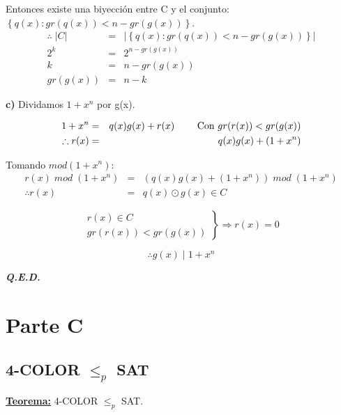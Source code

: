 \documentclass[12pt,a4paper]{report}
\newcommand{\QED}{\hfill \textit{\textbf{Q.E.D.}}}
\begin{document}
			\par Entonces existe una biyección entre C y el conjunto: $\left\lbrace q(x) :  gr(q(x)) < n - gr(g(x)) \right\rbrace$.
			\begin{eqnarray}
				\nonumber \therefore \; \lvert C \rvert &=& \lvert \left\lbrace q(x) : gr(q(x)) < n - gr(g(x)) \right\rbrace \rvert \\
				\nonumber 2^{k} &=& 2^{n - gr(g(x))} \\
				\nonumber k &=& n - gr(g(x)) \\
				\nonumber gr(g(x)) &=& n - k
			\end{eqnarray}

			\textbf{c)} Dividamos $1 + x^{n}$ por g(x).
			
				\begin{eqnarray}
						\nonumber 1 + x^{n} &=& q(x) g(x) + r(x) \qquad \textup{ Con } gr(r(x)) < gr(g(x)) \\
						\nonumber \therefore r(x) &=& q(x) g(x) + (1 + x^{n})
				\end{eqnarray}
				
				\par Tomando $mod (1 + x^{n})$:
					\begin{eqnarray}
						\nonumber r(x) \; mod \; (1 + x^{n}) &=& (q(x) g(x) + (1 + x^{n})) \; mod \; (1 + x^{n}) \\
						\nonumber \therefore r(x) &=& q(x) \odot g(x) \in C
					\end{eqnarray}
					
				\begin{equation*}
	  				\left.
	  				\begin{array}{l}
	    				r(x) \in C \\
	    				gr(r(x)) < gr(g(x))
	  				\end{array}
	 				\right\rbrace
	 				\Rightarrow r(x) = 0
			\end{equation*}
			
			\[
				\therefore g(x) \; | \; 1 + x^{n}
			\]

		\QED


\chapter{Parte C}

	\section{4-COLOR $\leq_{\textit{p}}$ SAT}
		\textbf{\underline{Teorema:}} 4-COLOR $\leq_{p}$ SAT.
\end{document}
